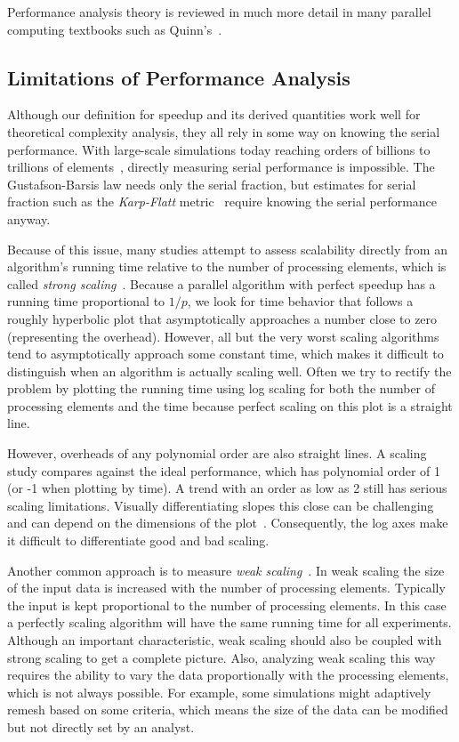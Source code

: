 \documentclass{llncs}
\newcommand*{\lcite}[1]{~\cite{#1}}
\newcommand*{\scite}[1]{~\cite{#1}}
\newcommand*{\keyterm}[1]{\emph{#1}}
\begin{document}
Performance analysis theory is reviewed in much more detail in many
parallel computing textbooks such as Quinn's\scite{Quinn2004}.

\subsection{Limitations of Performance Analysis}

\noindent
Although our definition for speedup and its derived quantities work well
for theoretical complexity analysis, they all rely in some way on knowing
the serial performance. With large-scale simulations today reaching orders
of billions to trillions of
elements\lcite{Bernaschi2013,Rossinelli2013,Bussmann2013,Habib2013},
directly measuring serial performance is impossible. The Gustafson-Barsis
law needs only the serial fraction, but estimates for serial
fraction such as the \keyterm{Karp-Flatt} metric\lcite{Karp1990} require
knowing the serial performance anyway.

Because of this issue, many studies attempt to assess scalability directly
from an algorithm's running time relative to the number of processing
elements, which is called \keyterm{strong scaling}\lcite{Kaminsky2014}.
Because a parallel algorithm with perfect speedup has a running time
proportional to $1/p$, we look for time behavior that follows a roughly
hyperbolic plot that asymptotically approaches a number close to zero
(representing the overhead). However, all but the very worst scaling
algorithms tend to asymptotically approach some constant time, which makes
it difficult to distinguish when an algorithm is actually scaling
well. Often we try to rectify the problem by plotting the running time
using log scaling for both the number of processing elements and the time
because perfect scaling on this plot is a straight line.

However, overheads of any polynomial order are also straight lines. A
scaling study compares against the ideal performance, which has polynomial
order of 1 (or -1 when plotting by time). A trend with an order as low as 2
still has serious scaling limitations. Visually differentiating slopes this
close can be challenging and can depend on the dimensions of the
plot\lcite{Cleveland1994}. Consequently, the log axes make it difficult to
differentiate good and bad scaling.

Another common approach is to measure \keyterm{weak scaling}\lcite{Kaminsky2014}.
In weak scaling the size of the input data is increased with the number of
processing elements. Typically the input is kept proportional to the number
of processing elements. In this case a perfectly scaling algorithm will
have the same running time for all experiments. Although an important
characteristic, weak scaling should also be coupled with strong scaling to
get a complete picture. Also, analyzing weak scaling this way requires the
ability to vary the data proportionally with the processing elements, which
is not always possible.  For example, some simulations might adaptively
remesh based on some criteria, which means the size of the data can be
modified but not directly set by an analyst.
\end{document}
